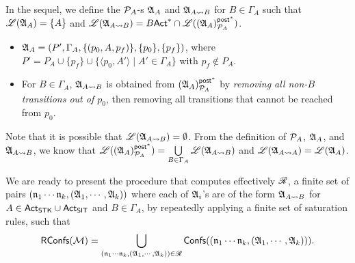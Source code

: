 In the sequel, we define the ${\mathcal{P} }_{A}$-{\NFA}s ${\mathfrak{A} }_{A}$ and ${\mathfrak{A} }_{A\rightsquigarrow B}$ for $B \in \Gamma_A$ such that ${\mathscr{L} }({\mathfrak{A} }_A) = \{A\}$ and ${\mathscr{L} }({\mathfrak{A} }_{A\rightsquigarrow B}) =B{\sf Act}^* \cap {\mathscr{L} }(({\mathfrak{A} }_{A})^{{\mathsf{post} }^*}_{{\mathcal{P} }_A})$. 
\begin{itemize}
    \item ${\mathfrak{A} }_{A} = (P', \Gamma_A, \{(p_0, A, p_f)\},\{p_0\},\{p_f\} )$, where $P' = P_A \cup \{p_f\} \cup \{\langle p_0,A'\rangle \mid A'\in\Gamma_A\}$ with $p_f \not \in P_A$.  
    \item For $B \in \Gamma_A$, ${\mathfrak{A} }_{A\rightsquigarrow B}$ is obtained from $({\mathfrak{A} }_{A})^{{\mathsf{post} }^*}_{{\mathcal{P} }_A}$ by \emph{removing all non-$B$ transitions out of $p_0$}, then removing all transitions that cannot be reached from $p_0$. 
\end{itemize}
Note that it is possible that ${\mathscr{L} }({\mathfrak{A} }_{A\rightsquigarrow B}) = \emptyset$.
From the definition of ${\mathcal{P} }_A$, ${\mathfrak{A} }_A$, and ${\mathfrak{A} }_{A\rightsquigarrow B}$, we know that ${\mathscr{L} }(({\mathfrak{A} }_A)^{{\mathsf{post} }^*}_{{\mathcal{P} }_A}) = \bigcup\limits_{B\in\Gamma_A} {\mathscr{L} }({\mathfrak{A} }_{A\rightsquigarrow B})$ and ${\mathscr{L} }({\mathfrak{A} }_{A\rightsquigarrow A}) = {\mathscr{L} }({\mathfrak{A} }_A)$. 


%

We are ready to present the procedure that computes effectively $\mathscr{R}$, a finite set of pairs $(\mathfrak{n}_1 \cdots \mathfrak{n}_k, ({\mathfrak{A} }_1, \cdots, {\mathfrak{A} }_k))$ where each of ${\mathfrak{A} }_i$'s are of the form ${\mathfrak{A} }_{A\rightsquigarrow B}$ for $A \in {\sf Act}_{\sf STK}\cup{\sf Act}_{\sf SIT}$ and $B \in \Gamma_A$, by repeatedly applying a finite set of saturation rules, such that
\[\mathsf{RConfs}({\mathcal{M} }) = \bigcup \limits_{(\mathfrak{n}_1 \cdots \mathfrak{n}_k, ({\mathfrak{A} }_1, \cdots, {\mathfrak{A} }_k)) \in \mathscr{R}} {\mathsf{Confs} }((\mathfrak{n}_1 \cdots \mathfrak{n}_k, ({\mathfrak{A} }_1, \cdots, {\mathfrak{A} }_k))).\]

